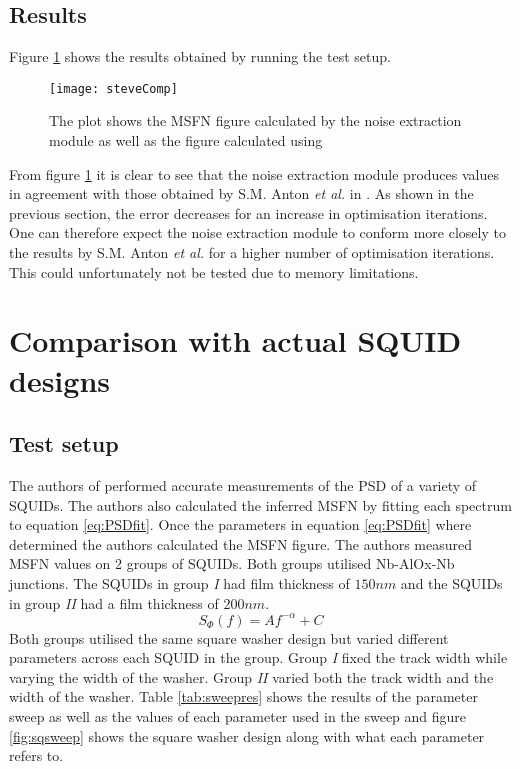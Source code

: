 \subsection{Results}
Figure \ref{fig:steveComp} shows the results obtained by running the test setup. 
\begin{figure}[H]

    \centering
    \texttt{[image: steveComp]}
    \caption{The plot shows the MSFN figure calculated by the noise extraction module as well as the figure calculated using \cite{msfnCode}}
    \label{fig:steveComp}
\end{figure}
From figure \ref{fig:steveComp} it is clear to see that the noise extraction module produces values in agreement with those obtained by S.M. Anton \textit{et al.} in \cite{fluxNoiseSquidsStevenAnton}. As shown in the previous section, the error decreases for an increase in optimisation iterations. One can therefore expect the noise extraction module to conform more closely to the results by S.M. Anton \textit{et al.} for a higher number of optimisation iterations. This could unfortunately not be tested due to memory limitations.

\section{Comparison with actual SQUID designs}
\subsection{Test setup}
The authors of \cite{fluxNoiseSquidsStevenAnton} performed accurate measurements of the PSD of a variety of SQUIDs. The authors also calculated the inferred MSFN by fitting each spectrum to equation \ref{eq:PSDfit}. Once the parameters in equation \ref{eq:PSDfit} where determined the authors calculated the MSFN figure. The authors measured MSFN values on 2 groups of SQUIDs. Both groups utilised Nb-AlOx-Nb junctions. The SQUIDs in group \textit{I} had film thickness of $150 nm$ and the SQUIDs in group \textit{II} had a film thickness of $200 nm$. 
\begin{equation}
    S_\Phi (f) = Af^{-\alpha}+C
    \label{eq:PSDfit}
\end{equation}
Both groups utilised the same square washer design but varied different parameters across each SQUID in the group. Group \textit{I} fixed the track width while varying the width of the washer. Group \textit{II} varied both the track width and the width of the washer. Table \ref{tab:sweepres} shows the results of the parameter sweep as well as the values of each parameter used in the sweep and figure \ref{fig:sqsweep} shows the square washer design along with what each parameter refers to.


